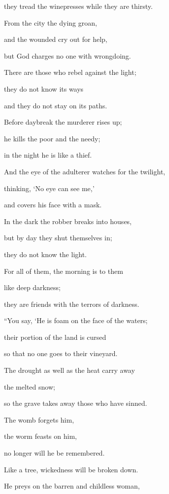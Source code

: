 {\par }{\Q they tread
the winepresses
while they are thirsty.
\par }{\Q {}From the city
the dying
groan,
\par }{\Q and the wounded
cry out for help,
\par }{\Q but God
charges
no
one with wrongdoing.
\par }{\Q {}There
are those
who rebel
against the light;
\par }{\Q they do not
know
its ways
\par }{\Q and they do not
stay
on its paths.
\par }{\Q {}Before daybreak
the murderer
rises
up;
\par }{\Q he kills
the poor
and the needy;
\par }{\Q in the night
he is like a thief.
\par }{\Q {}And the eye
of the adulterer
watches
for the twilight,
\par }{\Q thinking, ‘No
eye can see me,’
\par }{\Q and covers
his face
with a mask.
\par }{\Q {}In the dark
the robber
breaks into houses,
\par }{\Q but by day
they shut
themselves in;

\par }{\Q they do not
know
the light.
\par }{\Q {}For
all
of them, the morning
is to them
\par }{\Q like deep darkness;
\par }{\Q they are friends with the terrors
of darkness.
\par }{\Q “You say, ‘He is
foam
on
the face
of the waters;
\par }{\Q their portion
of the land
is cursed
\par }{\Q so that
no
one goes to their vineyard.
\par }{\Q {}The drought
as well
as the heat
carry away
\par }{\Q the melted
snow;
\par }{\Q so the grave
takes away those who
have sinned.
\par }{\Q {}The womb
forgets
him,
\par }{\Q the worm
feasts
on him,
\par }{\Q no
longer
will he be remembered.
\par }{\Q Like a tree,
wickedness
will be broken down.
\par }{\Q {}He preys
on the barren
and childless
woman,

}
